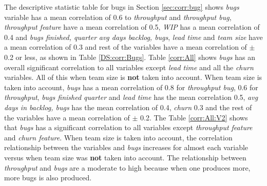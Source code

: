 \documentclass[UKenglish]{ifimaster}  %
\begin{document}


The descriptive statistic table for bugs in Section  \ref{sec:corr:bug} shows \textit{bugs} variable has a mean correlation of 0.6 to \textit{throughput} and \textit{throughput bug}, \textit{throughput feature} have a mean correlation of 0.5, \textit{WIP} has a mean correlation of 0.4 and  \textit{bugs finished, quarter} \textit{avg days backlog, bugs}, \textit{lead time} and \textit{team size} have a mean correlation  of 0.3 and rest of the variables have a mean correlation of $\pm$ 0.2 or less, as shown in Table \ref{DS:corr:Bugs}. Table \ref{corr:All} shows \textit{bugs} has an overall significant correlation  to all variables except \textit{lead time} and all the \textit{churn} variables. All of this when team size is \textbf{not} taken into account. When team size is taken into account, \textit{bugs} has a mean correlation of 0.8 for \textit{throughput bug}, 0.6 for \textit{throughput}, \textit{bugs finished quarter}  and \textit{lead time} has the mean correlation 0.5, \textit{avg days in backlog, bugs} has the mean correlation of 0.4, \textit{churn} 0.3 and the rest of the variables have a mean correlation of $\pm$ 0.2. The Table \ref{corr:All:V2} shows that \textit{bugs} has a significant correlation to all variables except \textit{throughput feature} and \textit{churn feature}.  When team size is taken into account, the correlation relationship between the variables and \textit{bugs} increases for almost each variable versus when team size was \textbf{not} taken into account. The relationship between \textit{throughput} and \textit{bugs} are a moderate to high because when one produces more, more bugs is also produced. 
\end{document}
